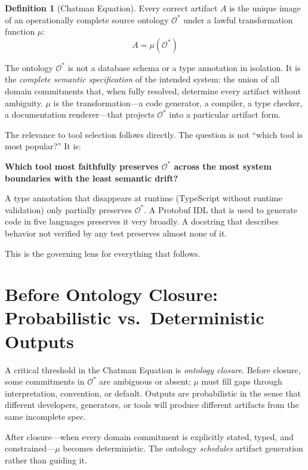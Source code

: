 \documentclass[11pt,a4paper]{article}
\theoremstyle{definition}
\newtheorem{definition}{Definition}
\begin{document}
\begin{definition}[Chatman Equation]
Every correct artifact $A$ is the unique image of an operationally complete source ontology $\mathcal{O}^*$ under a lawful transformation function $\mu$:
$$A = \mu(\mathcal{O}^*)$$
\end{definition}

The ontology $\mathcal{O}^*$ is not a database schema or a type annotation in isolation. It is the \emph{complete semantic specification} of the intended system: the union of all domain commitments that, when fully resolved, determine every artifact without ambiguity. $\mu$ is the transformation---a code generator, a compiler, a type checker, a documentation renderer---that projects $\mathcal{O}^*$ into a particular artifact form.

The relevance to tool selection follows directly. The question is not ``which tool is most popular?'' It is:

\begin{rulebox}
\textbf{Which tool most faithfully preserves $\mathcal{O}^*$ across the most system boundaries with the least semantic drift?}
\end{rulebox}

A type annotation that disappears at runtime (TypeScript without runtime validation) only partially preserves $\mathcal{O}^*$. A Protobuf IDL that is used to generate code in five languages preserves it very broadly. A docstring that describes behavior not verified by any test preserves almost none of it.

This is the governing lens for everything that follows.

\section{Before Ontology Closure: Probabilistic vs.\ Deterministic Outputs}

A critical threshold in the Chatman Equation is \emph{ontology closure}. Before closure, some commitments in $\mathcal{O}^*$ are ambiguous or absent; $\mu$ must fill gaps through interpretation, convention, or default. Outputs are probabilistic in the sense that different developers, generators, or tools will produce different artifacts from the same incomplete spec.

After closure---when every domain commitment is explicitly stated, typed, and constrained---$\mu$ becomes deterministic. The ontology \emph{schedules} artifact generation rather than guiding it.
\end{document}
